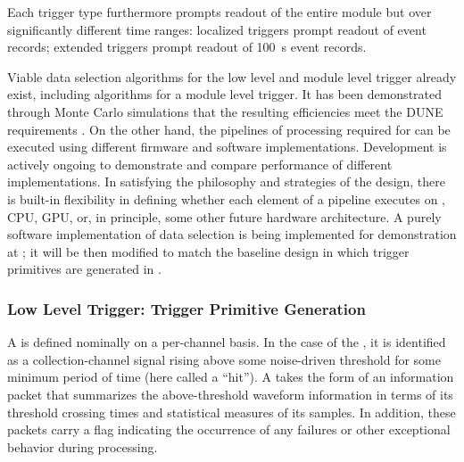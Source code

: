 \noindent Each trigger type furthermore prompts readout
of the entire module but over significantly different time
ranges: localized triggers prompt readout of \spreadout event records; extended
triggers prompt readout of \SI{100}{\second} event records. 



Viable data selection algorithms for the low level and module level trigger already exist, including
algorithms for a module level  trigger.  It has
been demonstrated through Monte Carlo simulations that the resulting efficiencies meet the DUNE
requirements \cite{bib:docdb11215}. On the other hand, the pipelines of processing required
for  can be executed using different firmware and software
implementations. Development is actively ongoing to demonstrate
and compare performance of different implementations. In satisfying
the philosophy and strategies of the  design, there is built-in
flexibility in defining whether each element of a pipeline executes on
, CPU, GPU, or, in principle, some other future hardware
architecture. A purely software implementation of data selection is being
implemented for demonstration at ; it will be then modified to match the baseline design in which trigger primitives are generated in .

\subsubsection{Low Level Trigger: Trigger Primitive Generation}
\label{sec:sp-daq:design-trigger-primitives}

A  is defined nominally on a per-channel basis. In the case of
the , it is identified as a collection-channel signal rising above some
noise-driven threshold for some minimum period of time (here called a
``hit'').
A  takes the form of an information packet that 
summarizes the above-threshold waveform information in terms of its
threshold crossing times and statistical measures of its  samples. 
In addition, these packets carry a flag indicating the occurrence of any
failures or other exceptional behavior during  processing.



